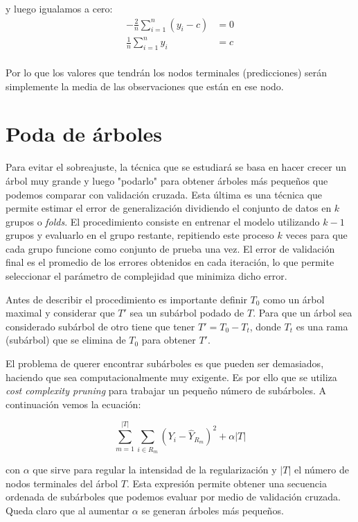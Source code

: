 y luego igualamos a cero:
\begin{equation}
    \begin{aligned}
        -\frac{2}{n}\sum_{i=1}^{n}(y_i-c)&=0  \\
        \frac{1}{n}\sum_{i=1}^{n}y_i&=c  \\
    \end{aligned}
\end{equation}

Por lo que los valores que tendrán los nodos terminales (predicciones) serán simplemente la media de las observaciones que están en ese nodo.

\section{Poda de árboles}

Para evitar el sobreajuste, la técnica que se estudiará se basa en hacer crecer un árbol muy grande y luego "podarlo" para obtener árboles más pequeños que podemos comparar con validación cruzada. Esta última es una técnica que permite estimar el error de generalización dividiendo el conjunto de datos en $k$ grupos o \textit{folds}. El procedimiento consiste en entrenar el modelo utilizando $k-1$ grupos y evaluarlo en el grupo restante, repitiendo este proceso $k$ veces para que cada grupo funcione como conjunto de prueba una vez. El error de validación final es el promedio de los errores obtenidos en cada iteración, lo que permite seleccionar el parámetro de complejidad que minimiza dicho error.

Antes de describir el procedimiento es importante definir $T_0$ como un árbol maximal y considerar que $T'$ sea un subárbol podado de $T$. Para que un árbol sea considerado subárbol de otro tiene que tener $T' = T_0 - T_t$, donde $T_t$ es una rama (subárbol) que se elimina de $T_0$ para obtener $T'$.

El problema de querer encontrar subárboles es que pueden ser demasiados, haciendo que sea computacionalmente muy exigente. Es por ello que se utiliza \textit{cost complexity pruning} para trabajar un pequeño número de subárboles. A continuación vemos la ecuación:

\begin{equation}
    \sum_{m=1}^{|T|}\sum_{i \in R_m}(Y_i-\hat{Y}_{R_m})^2+ \alpha |T|
\end{equation}

con $\alpha$ que sirve para regular la intensidad de la regularización y $|T|$ el número de nodos terminales del árbol $T$. Esta expresión permite obtener una secuencia ordenada de subárboles que podemos evaluar por medio de validación cruzada. Queda claro que al aumentar $\alpha$ se generan árboles más pequeños.

